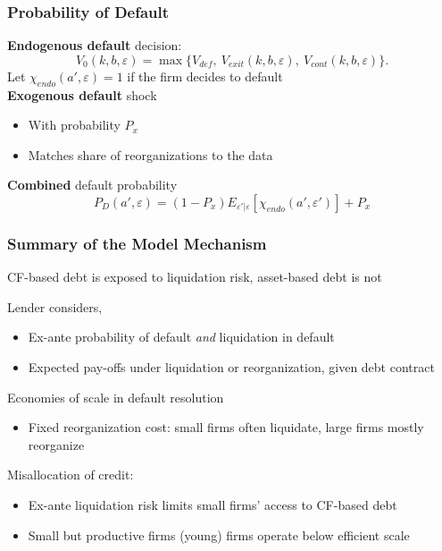 \documentclass[aspectratio=169,xcolor=table]{beamer}
\begin{document}
\begin{frame}[label=Default] \frametitle{Probability of Default \hfill \hyperlink{LiqReorg}{}}
\textbf{Endogenous default} decision:
\begin{equation*} \label{eq:default decision}
    V_0(k,b,\varepsilon) = \max \{V_{def}, \  V_{exit}(k,b,\varepsilon),  \ V_{cont}(k,b,\varepsilon) \}.
\end{equation*}
Let $\chi_{endo}(a', \varepsilon) = 1$ if the firm decides to default \vspace{3mm} \\

\textbf{Exogenous default} shock 
\begin{itemize} \small
    \item With probability $P_{x}$
    \item Matches share of reorganizations to the data
\end{itemize} \normalsize

\textbf{Combined} default probability 
$$  P_D(a', \varepsilon) = (1-P_x)E_{\varepsilon'|\varepsilon}[\chi_{endo}(a',\varepsilon')] + P_{x}  $$


\end{frame}



\begin{frame}[label=mechanism] \frametitle{Summary of the Model Mechanism \hfill \hyperlink{Qfull}{}}

CF-based debt is exposed to liquidation risk, asset-based debt is not 

Lender considers,
\begin{itemize} \small
    \item Ex-ante probability of default \textit{and} liquidation in default
    \item Expected pay-offs under liquidation or reorganization, given debt contract
    \end{itemize} \normalsize \vspace{3mm} 


Economies of scale in default resolution
\begin{itemize} \small
    \item Fixed reorganization cost: small firms often liquidate, large firms mostly reorganize 
\end{itemize} \normalsize \vspace{3mm} 

Misallocation of credit:
\begin{itemize} \small
    \item Ex-ante liquidation risk limits small firms' access to CF-based debt
    \item Small but productive firms (young) firms operate below efficient scale 
\end{itemize} \normalsize


\end{frame}
\end{document}
